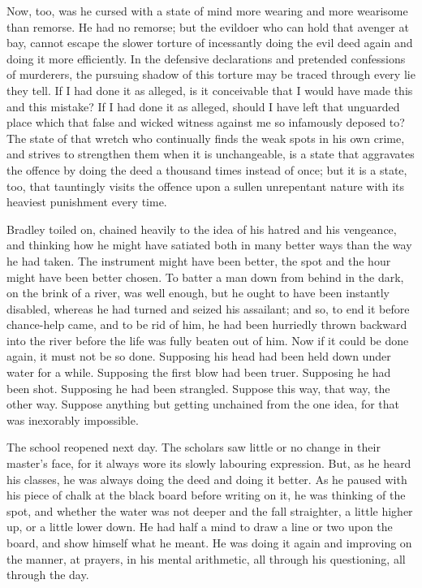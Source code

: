 Now, too, was he cursed with a state of mind more wearing and more
wearisome than remorse. He had no remorse; but the evildoer who can hold
that avenger at bay, cannot escape the slower torture of incessantly
doing the evil deed again and doing it more efficiently. In the
defensive declarations and pretended confessions of murderers, the
pursuing shadow of this torture may be traced through every lie they
tell. If I had done it as alleged, is it conceivable that I would have
made this and this mistake? If I had done it as alleged, should I have
left that unguarded place which that false and wicked witness against me
so infamously deposed to? The state of that wretch who continually finds
the weak spots in his own crime, and strives to strengthen them when
it is unchangeable, is a state that aggravates the offence by doing
the deed a thousand times instead of once; but it is a state, too, that
tauntingly visits the offence upon a sullen unrepentant nature with its
heaviest punishment every time.

Bradley toiled on, chained heavily to the idea of his hatred and his
vengeance, and thinking how he might have satiated both in many better
ways than the way he had taken. The instrument might have been better,
the spot and the hour might have been better chosen. To batter a man
down from behind in the dark, on the brink of a river, was well enough,
but he ought to have been instantly disabled, whereas he had turned and
seized his assailant; and so, to end it before chance-help came, and
to be rid of him, he had been hurriedly thrown backward into the river
before the life was fully beaten out of him. Now if it could be done
again, it must not be so done. Supposing his head had been held down
under water for a while. Supposing the first blow had been truer.
Supposing he had been shot. Supposing he had been strangled. Suppose
this way, that way, the other way. Suppose anything but getting
unchained from the one idea, for that was inexorably impossible.

The school reopened next day. The scholars saw little or no change in
their master’s face, for it always wore its slowly labouring expression.
But, as he heard his classes, he was always doing the deed and doing it
better. As he paused with his piece of chalk at the black board before
writing on it, he was thinking of the spot, and whether the water was
not deeper and the fall straighter, a little higher up, or a little
lower down. He had half a mind to draw a line or two upon the board, and
show himself what he meant. He was doing it again and improving on
the manner, at prayers, in his mental arithmetic, all through his
questioning, all through the day.

